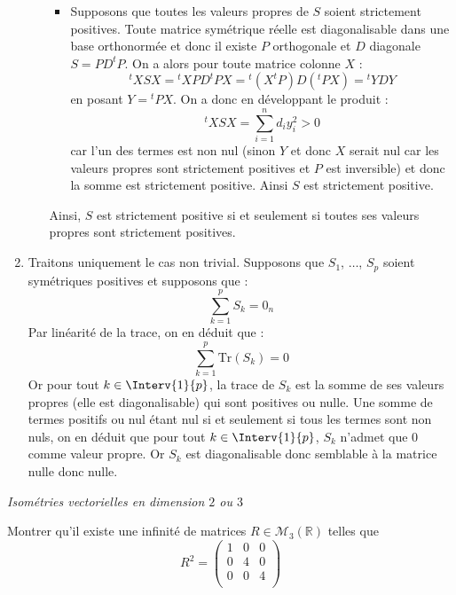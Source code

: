 \documentclass[a4paper,10pt]{report}
\begin{document}
\begin{enumerate}
\begin{enumerate}
\begin{itemize}
\item Supposons que toutes les valeurs propres de $S$ soient strictement positives. Toute matrice sym\'etrique r\'eelle est diagonalisable dans une base orthonorm\'ee et donc il existe $P$ orthogonale et $D$ diagonale $S=PD^{t}P$. On a alors pour toute matrice colonne $X$ :
$$^{t}XSX={}^{t}XPD^{t}PX={}^{t}\left( X^{t}P\right) D(^{t}PX)={}^{t}YDY$$
en posant $Y={}^{t}PX$. On a donc en développant le produit :
$$^{t}XSX= \sum_{i=1}^{n}d_{i}y_{i}^{2} > 0$$
car l'un des termes est non nul (sinon $Y$ et donc $X$ serait nul car les valeurs propres sont strictement positives et $P$ est inversible) et donc la somme est strictement positive. Ainsi $S$ est strictement positive.
\end{itemize}
Ainsi, $S$ est strictement positive si et seulement si toutes ses valeurs propres sont strictement positives.
\end{enumerate}
\item Traitons uniquement le cas non trivial. Supposons que $S_1$, $\ldots$, $S_p$ soient symétriques positives et supposons que :
$$\sum_{k=1}^p S_k = 0_n$$
Par linéarité de la trace, on en déduit que :
$$ \sum_{k=1}^p \textrm{Tr}(S_k) = 0$$
Or pour tout $k \in \Interv{1}{p}$, la trace de $S_k$ est la somme de ses valeurs propres (elle est diagonalisable) qui sont positives ou nulle. Une somme de termes positifs ou nul étant nul si et seulement si tous les termes sont non nuls, on en déduit que pour tout $k \in \Interv{1}{p}$, $S_k$ n'admet que $0$ comme valeur propre. Or $S_k$ est diagonalisable donc semblable à la matrice nulle donc nulle.
\end{enumerate}

\medskip

\begin{center}
\textit{{ {\large Isométries vectorielles en dimension $2$ ou $3$}}}
\end{center}

\medskip

\begin{Exa} Montrer qu'il existe une infinité de matrices $R \in \mathcal{M}_3(\mathbb{R})$ telles que
$$  R^2 = \begin{pmatrix}
1 & 0 & 0 \\
0 & 4 & 0 \\
0 & 0 & 4 \\
\end{pmatrix}$$
\end{Exa}
\end{document}
